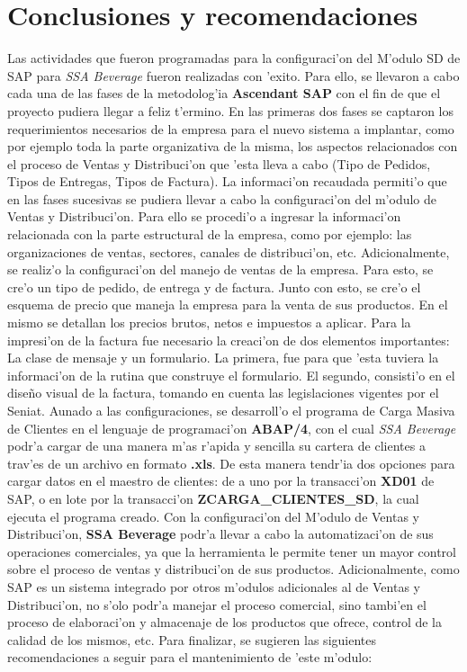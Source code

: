 \chapter{Conclusiones y recomendaciones} \label{chap:conclusiones}

	Las actividades que fueron programadas para la configuraci'on del M'odulo SD de SAP para \textit{SSA Beverage} fueron realizadas con 'exito. Para ello, se llevaron a cabo cada una de las fases de la metodolog'ia \textbf{Ascendant SAP} con el fin de que el proyecto pudiera llegar a feliz t'ermino.  En las primeras dos fases se captaron los requerimientos necesarios de la empresa para el nuevo sistema a implantar, como por ejemplo toda la parte organizativa de la misma, los aspectos relacionados con el proceso de Ventas y Distribuci'on que 'esta lleva a cabo (Tipo de Pedidos, Tipos de Entregas, Tipos de Factura). 
	La informaci'on recaudada permiti'o que en las fases sucesivas se pudiera llevar a cabo la configuraci'on del m'odulo de Ventas y Distribuci'on. Para ello se procedi'o a ingresar la informaci'on relacionada con la parte estructural de la empresa, como por ejemplo: las organizaciones de ventas, sectores, canales de distribuci'on, etc. Adicionalmente, se realiz'o la configuraci'on del manejo de ventas de la empresa. Para esto, se cre'o un tipo de pedido, de entrega y de factura. Junto con esto, se cre'o el esquema de precio que maneja la empresa para la venta de sus productos. En el mismo se detallan los precios brutos, netos e impuestos a aplicar. Para la impresi'on de la factura fue necesario la creaci'on de dos elementos importantes: La clase de mensaje y un formulario. La primera, fue para que 'esta tuviera la informaci'on de la rutina que construye el formulario. El segundo, consisti'o en el dise\~no visual de la factura, tomando en cuenta las legislaciones vigentes por el Seniat.
	Aunado a las configuraciones, se desarroll'o el programa de Carga Masiva de Clientes en el lenguaje de programaci'on \textbf{ABAP/4}, con el cual \textit{SSA Beverage} podr'a cargar de una manera m'as r'apida y sencilla su cartera de clientes a trav'es de un archivo en formato \textbf{.xls}. De esta manera tendr'ia dos opciones para cargar datos en el maestro de clientes: de a uno por la transacci'on \textbf{XD01} de SAP, o en lote por la transacci'on \textbf{ZCARGA\_CLIENTES\_SD}, la cual ejecuta el programa creado.
	Con la configuraci'on del M'odulo de Ventas y Distribuci'on, \textbf{SSA Beverage} podr'a llevar a cabo la automatizaci'on de sus operaciones comerciales, ya que la herramienta le permite tener un mayor control sobre el proceso de ventas y distribuci'on de sus productos. Adicionalmente, como SAP es un sistema integrado por otros m'odulos adicionales al de Ventas y Distribuci'on, no s'olo podr'a manejar el proceso comercial, sino tambi'en el proceso de elaboraci'on y almacenaje de los productos que ofrece, control de la calidad de los mismos, etc.
	Para finalizar, se sugieren las siguientes recomendaciones a seguir para el mantenimiento de 'este m'odulo:

